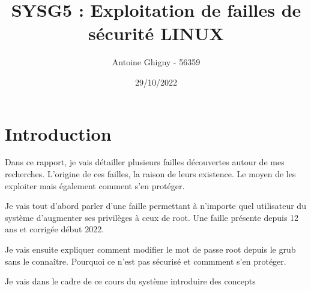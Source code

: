 \documentclass[a4paper, 12pt]{article}
\title{SYSG5 : Exploitation de failles de sécurité LINUX}
\author{Antoine Ghigny - 56359}          \let\Author\@author
\date{29/10/2022}           \let\Date\@date
\begin{document}
\maketitle 

   \tableofcontents

    \newpage
   \section{Introduction}
   \begin{flushleft}
       \noindent Dans ce rapport, je vais détailler plusieurs failles découvertes autour de mes recherches. L'origine de ces failles, la raison de leurs existence. Le moyen de les exploiter mais également comment s'en protéger.
       \item Je vais tout d'abord parler d'une faille permettant à n'importe quel utilisateur du système d'augmenter ses privilèges à ceux de root. Une faille présente depuis 12 ans et corrigée début 2022. 
       \item Je vais ensuite expliquer comment modifier le mot de passe root depuis le grub sans le connaître. Pourquoi ce n'est pas sécurisé et commment s'en protéger. 
       \item Je vais dans le cadre de ce cours du système introduire des concepts
   \end{flushleft}
\end{document}
